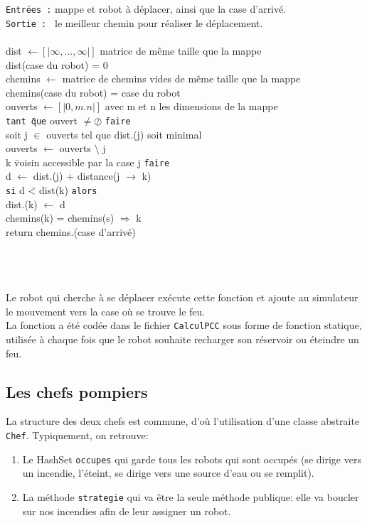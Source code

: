 \documentclass[a4paper,8pt]{article} %
\begin{document}
\begin{tabbing}
{\tt Entrées :} mappe et robot à déplacer, ainsi que la case d'arrivé.\\
{\tt Sortie : } le meilleur chemin pour réaliser le déplacement. \\ \\
dist $\leftarrow [|\infty,...,\infty|]$          matrice de même taille que la mappe \\
dist(case du robot) = 0\\
chemins $\leftarrow$          matrice de chemins vides de même taille que la mappe\\
chemins(case du robot) = case du robot \\
ouverts $\leftarrow [|0,m.n|]$          avec m et n les dimensions de la mappe\\
{\tt tant \= que} ouvert $\neq \oslash$ {\tt faire}\\
\> soit j $\in$ ouverts tel que dist.(j) soit minimal\\
\> ouverts $\leftarrow $ ouverts $\setminus$ {j}\\
 k \= voisin accessible par la case j {\tt faire} \\
\>\> d $\leftarrow$ dist.(j) + distance(j $\rightarrow$ k)\\
\> \> {\tt si} d \=< dist(k) {\tt alors} \\
\> \> \> dist.(k) $\leftarrow$ d\\
\> \> \> chemins(k) = chemins(s) $\Rightarrow$ k\\
return chemins.(case d'arrivé)
\end{tabbing}

\\ \\ \\

Le robot qui cherche à se déplacer exécute cette fonction et ajoute au simulateur le mouvement vers la case où se trouve le feu. \\
La fonction a été codée dans le fichier {\tt CalculPCC} sous forme de fonction statique, utilisée à chaque fois que le robot souhaite recharger son réservoir ou éteindre un feu.


\subsection{Les chefs pompiers}
La structure des deux chefs est commune, d'où l'utilisation d'une classe abstraite \texttt{Chef}. Typiquement, on retrouve:
\begin{enumerate}
    \item Le HashSet \texttt{occupes} qui garde tous les robots qui sont occupés (se dirige vers un incendie, l'éteint,
    se dirige vers une source d'eau ou se remplit).
    \item La méthode \texttt{strategie} qui va être la seule méthode publique: elle va boucler sur nos incendies afin de leur assigner un robot.
\end{enumerate}
\end{document}
